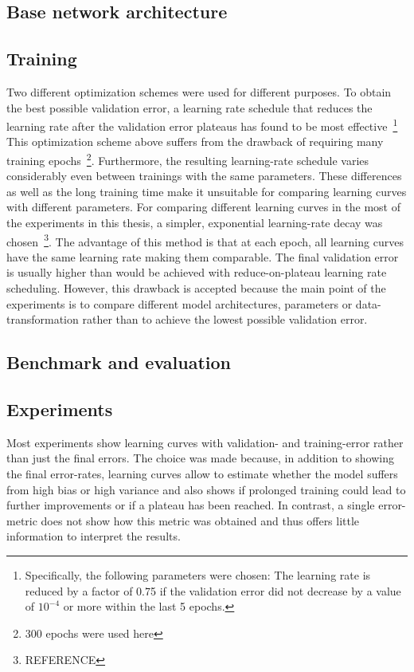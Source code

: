 

\subsection{Base network architecture}



\subsection{Training}
\label{sec:training}

Two different optimization schemes were used for different purposes.
To obtain the best possible validation error, a learning rate schedule that reduces the learning rate after the validation error plateaus has found to be most effective~\footnote{Specifically, the following parameters were chosen: The learning rate is reduced by a factor of 0.75 if the validation error did not decrease by a value of $10^{-4}$ or more within the last 5 epochs.} This optimization scheme above suffers from the drawback of requiring many training epochs~\footnote{300 epochs were used here}. Furthermore, the resulting learning-rate schedule varies considerably even between trainings with the same parameters. These differences as well as the long training time make it unsuitable for comparing learning curves with different parameters.
For comparing different learning curves in the most of the experiments in this thesis, a simpler, exponential learning-rate decay was chosen~\footnote{REFERENCE}. The advantage of this method is that at each epoch, all learning curves have the same learning rate making them comparable. The final validation error is usually higher than would be achieved with reduce-on-plateau learning rate scheduling. However, this drawback is accepted because the main point of the experiments is to compare different model architectures, parameters or data-transformation rather than to achieve the lowest possible validation error.



\subsection{Benchmark and evaluation}


\subsection{Experiments}

Most experiments show learning curves with validation- and training-error rather than just the final errors. The choice was made because, in addition to showing the final error-rates, learning curves allow to estimate whether the model suffers from high bias or high variance and also shows if prolonged training could lead to further improvements or if a plateau has been reached. In contrast, a single error-metric does not show how this metric was obtained and thus offers little information to interpret the results.


